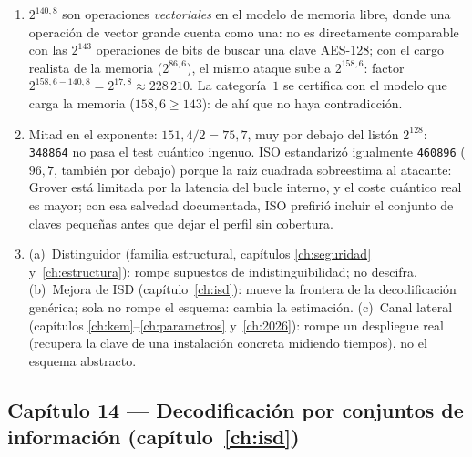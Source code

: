 \begin{enumerate}[leftmargin=1.9em,itemsep=4pt]
        puede mejorar (2025--2026 lo mostró). En la práctica, el
        que sostiene las decisiones es (c): las categorías y los
        márgenes se calculan con el mejor ataque conocido; la
        conjetura es el marco de la promesa.
  \item $2^{140{,}8}$ son operaciones \emph{vectoriales} en el
        modelo de memoria libre, donde una operación de vector
        grande cuenta como una: no es directamente comparable con
        las $2^{143}$ operaciones de bits de buscar una clave
        AES-128; con el cargo realista de la memoria ($2^{86{,}6}$),
        el mismo ataque sube a $2^{158{,}6}$: factor
        $2^{158{,}6-140{,}8}=2^{17{,}8}\approx228\,210$. La
        categoría~$1$ se certifica con el modelo que carga la
        memoria ($158{,}6\ge143$): de ahí que no haya
        contradicción.
  \item Mitad en el exponente: $151{,}4/2=75{,}7$, muy por debajo
        del listón $2^{128}$: \texttt{348864} no pasa el test
        cuántico ingenuo. ISO estandarizó igualmente
        \texttt{460896} ($96{,}7$, también por debajo) porque la
        raíz cuadrada sobreestima al atacante: Grover está limitada
        por la latencia del bucle interno, y el coste cuántico real
        es mayor; con esa salvedad documentada, ISO prefirió
        incluir el conjunto de claves pequeñas antes que dejar el
        perfil sin cobertura.
  \item (a)~Distinguidor (familia estructural, capítulos
        \ref{ch:seguridad} y~\ref{ch:estructura}): rompe supuestos
        de indistinguibilidad; no descifra. (b)~Mejora de ISD
        (capítulo~\ref{ch:isd}): mueve la frontera de la
        decodificación genérica; sola no rompe el esquema: cambia
        la estimación. (c)~Canal lateral (capítulos
        \ref{ch:kem}--\ref{ch:parametros} y~\ref{ch:2026}): rompe
        un despliegue real (recupera la clave de una instalación
        concreta midiendo tiempos), no el esquema abstracto.
\end{enumerate}

\subsection*{Capítulo 14 --- Decodificación por conjuntos de
información (capítulo~\ref{ch:isd})}

